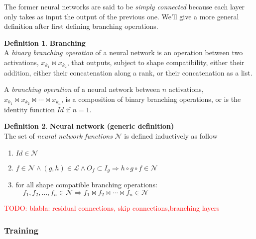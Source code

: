 \documentclass{article}
\theoremstyle{definition}
\newtheorem{definition}{Definition}[section]
\theoremstyle{remark}
\theoremstyle{plain}
\newcommand{\nn}{\mathcal{N}}
\newcommand{\lf}{\mathcal{L}}
\newcommand{\todo}[1]{\textcolor{red}{TODO: #1\\}}
\begin{document}
The former neural networks are said to be \emph{simply connected} because each layer only takes as input the output of the previous one. We'll give a more general definition after first defining branching operations.

\begin{definition}\textbf{Branching}\\
A \emph{binary branching operation} of a neural network is an operation between two activations, $x_{k_1} \Join x_{k_2}$, that outputs, subject to shape compatibility, either their addition, either their concatenation along a rank, or their concatenation as a list.

A \emph{branching operation} of a neural network between $n$ activations, $x_{k_1} \Join x_{k_2} \Join \cdots \Join x_{k_n}$, is a composition of binary branching operations, or is the identity function $Id$ if $n = 1$.
\end{definition}

\begin{definition}\textbf{Neural network (generic definition)}\\
The set of \emph{neural network functions} $\nn$ is defined inductively as follow
\begin{enumerate}
  \item $Id \in \nn$
  \item $f \in \nn \wedge (g,h) \in \lf \wedge O_f \subset I_g \Rightarrow h \circ g \circ f \in \nn$
  \item for all shape compatible branching operations:\\
  $\quad f_1, f_2, \ldots, f_n \in \nn \Rightarrow  f_1 \Join f_2 \Join \cdots \Join f_n \in \nn$
\end{enumerate}
\label{def:nn2}
\end{definition}

\todo{blabla: residual connections, skip connections,branching layers}

\subsubsection{Training}
\end{document}
